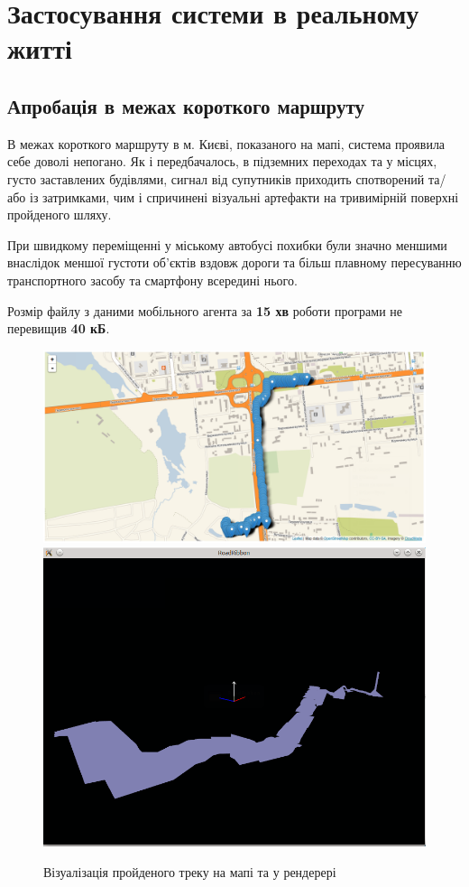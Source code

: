 \documentclass[simple,a4paper,14pt,ukrainian,utf8]{eskdtext}
\begin{document}
    \clearpage \newpage 
    
    \section{Застосування системи в реальному житті}

	\subsection{Апробація в межах короткого маршруту}
	
	В межах короткого маршруту в м. Києві, показаного на мапі, система проявила себе доволі непогано. Як і передбачалось, в підземних переходах та у місцях, густо заставлених будівлями, сигнал від супутників приходить спотворений та/або із затримками, чим і спричинені візуальні артефакти на тривимірній поверхні пройденого шляху.
	
	При швидкому переміщенні у міському автобусі похибки були значно меншими внаслідок меншої густоти об’єктів вздовж дороги та більш плавному пересуванню транспортного засобу та смартфону всередині нього.
	
	Розмір файлу з даними мобільного агента за \textbf{15 хв} роботи програми не перевищив \textbf{40 кБ}.
	
		\begin{figure}
			\centering \includegraphics[scale=0.35]{images/results1.png}
			\vspace{2em}
			\centering \includegraphics[scale=0.5]{images/results2.png}
			\caption{Візуалізація пройденого треку на мапі та у рендерері}
		\end{figure}
\end{document}

